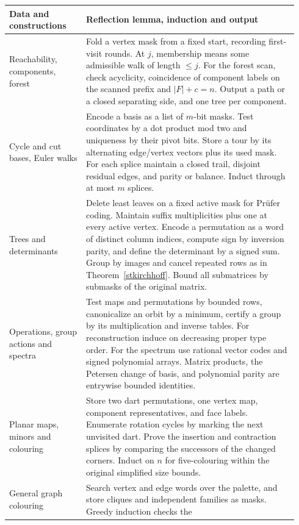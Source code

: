 \begin{longtable}{@{} >{\raggedright\arraybackslash}p{0.25\linewidth}@{\hspace{0.035\linewidth}}p{0.69\linewidth}@{}}
\toprule
Data and constructions & Reflection lemma, induction and output\\ \midrule\endhead
Reachability, components, forest & Fold a vertex mask from a fixed start, recording
first-visit rounds. At $j$, membership means some admissible walk of length
$\le j$. For the forest scan, check acyclicity, coincidence of component labels
on the scanned prefix and $|F|+c=n$. Output a path or a closed separating side,
and one tree per component.\\[4pt]
Cycle and cut bases, Euler walks & Encode a basis as a list of $m$-bit masks.
Test coordinates by a dot product mod two and uniqueness by their pivot bits.
Store a tour by its alternating edge/vertex vectors plus its used mask.
For each splice maintain a closed trail, disjoint residual edges, and parity
or balance. Induct through at most $m$ splices.\\[4pt]
Trees and determinants & Delete least leaves on a fixed active mask for
Pr\"ufer coding. Maintain suffix multiplicities plus one at every active
vertex. Encode a permutation as a word of distinct column indices, compute
sign by inversion parity, and define the determinant by a signed sum.
Group by images and cancel repeated rows as in Theorem~\ref{stkirchhoff}.
Bound all submatrices by submasks of the original matrix.\\[4pt]
Operations, group actions and spectra & Test maps and permutations by bounded
rows, canonicalize an orbit by a minimum, certify a group by its multiplication
and inverse tables. For reconstruction induce on decreasing proper type order.
For the spectrum use rational vector codes and signed polynomial arrays.
Matrix products, the Petersen change of basis, and polynomial parity are
entrywise bounded identities.\\[4pt]
Planar maps, minors and colouring & Store two dart permutations, one vertex map,
component representatives, and face labels. Enumerate rotation cycles by
marking the next unvisited dart. Prove the insertion and contraction splices
by comparing the successors of the changed corners. Induct on $n$ for
five-colouring within the original simplified size bounds.\\[4pt]
General graph colouring & Search vertex and edge words over the palette, and
store cliques and independent families as masks. Greedy induction checks the

\end{longtable}
